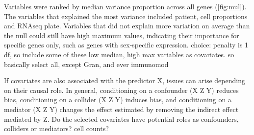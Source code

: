 \begin{outline}
\1 Variables were ranked by median variance proportion across all genes (\autoref{fig:mul}).
The variables that explained the most variance included patient, cell proportions and \gls{RNAseq} plate.
Variables that did not explain more variation on average than the null could still have high maximum values, 
indicating their importance for specific genes only, such as genes with sex-specific expression.
    \2 choice: penalty is 1 df, so include some of these low median, high max variables as covariates.
    \2 so basically select all, except Gran, and ever immunomod

\1 If covariates are also associated with the predictor X, issues can arise depending on their causal role.
In general,
conditioning on a confounder (X \textleftarrow Z \textrightarrow Y) reduces bias,
conditioning on a collider (X \textrightarrow Z \textleftarrow Y) induces bias,
and conditioning on a mediator (X \textrightarrow Z \textrightarrow Y) changes the effect estimated by removing the indirect effect mediated by Z.
    \2 Do the selected covariates have potential roles as confounders, colliders or mediators?
    \2 cell counts?



\end{outline}
